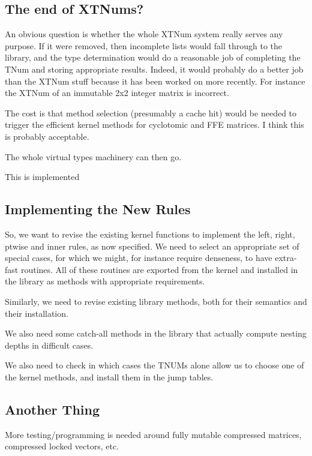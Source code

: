 \documentclass{article}
\begin{document}
\subsection{The end of XTNums?}

An obvious question is whether the whole XTNum system really serves
any purpose.  If it were removed, then incomplete lists would fall
through to the library, and the type determination would do a
reasonable job of completing the TNum and storing appropriate
results. Indeed, it would probably do a better job than the XTNum
stuff because it has been worked on more recently. For instance the
XTNum of an immutable 2x2 integer matrix is incorrect. 

The cost is that method selection (presumably a cache hit) would be
needed to trigger the efficient kernel methods for cyclotomic and FFE
matrices. I think this is probably acceptable.

The whole virtual types machinery can then go.

This is implemented

\subsection{Implementing the New Rules}

So, we want to revise the existing kernel functions to implement the
left, right, ptwise and inner rules, as now specified. We need to
select an appropriate set of special cases, for which we might, for
instance require denseness, to have extra-fast routines. All of these
routines are exported from the kernel and installed in the library as
methods with appropriate requirements. 

Similarly, we need to revise existing library methods, both for their
semantics and their installation.

We also need some catch-all methods in the library that actually
compute nesting depths in difficult cases. 

We also need to check in which cases the TNUMs alone allow us to
choose one of the kernel methods, and install them in the jump tables.


\subsection{Another Thing}

More testing/programming is needed around fully mutable compressed
matrices, compressed locked vectors, etc.
\end{document}
